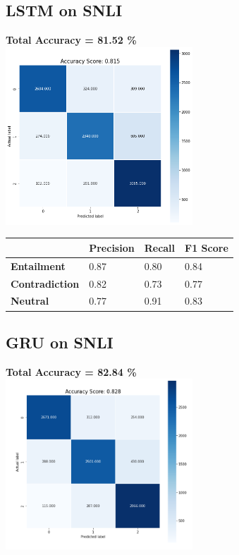 \documentclass[12pt, conference]{IEEEtran}
\begin{document}
\subsection{LSTM on SNLI}
\textbf{Total Accuracy = 81.52 \%}\\
\includegraphics[width=7cm]{images/results/SNLIlstm.png}

\begin{table}[h]
\begin{tabular}{|l|l|l|l|}
\hline
                       & \textbf{Precision} & \textbf{Recall} & \textbf{F1 Score} \\ \hline
\textbf{Entailment}    & 0.87               & 0.80            & 0.84              \\ \hline
\textbf{Contradiction} & 0.82               & 0.73            & 0.77              \\ \hline
\textbf{Neutral}       & 0.77               & 0.91            & 0.83              \\ \hline
\end{tabular}
\end{table}

\subsection{GRU on SNLI}
\textbf{Total Accuracy = 82.84 \%}\\
\includegraphics[width=7cm]{images/results/SNLIgru.png}
\end{document}
